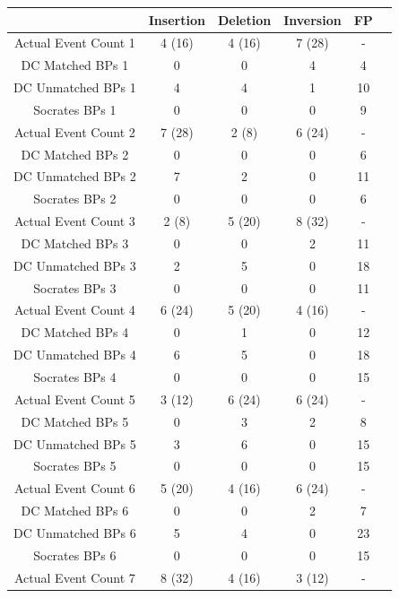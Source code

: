 \documentclass{easychithesis}
\begin{document}
\begin{table}[h]
\begin{center}
\begin{tabular}{|c|c|c|c|c|c|}\hline
         & Insertion & Deletion & Inversion & FP \\
        \hline 
        Actual Event Count 1 & 4 (16) & 4 (16) & 7 (28) & -\\
        DC Matched BPs 1 & 0 & 0 & 4 & 4\\
        DC Unmatched BPs 1 & 4 & 4 & 1 & 10\\
        Socrates BPs 1 & 0 & 0 & 0 & 9\\
        \hline 
        Actual Event Count 2 & 7 (28) & 2 (8) & 6 (24) & -\\
        DC Matched BPs 2 & 0 & 0 & 0 & 6\\
        DC Unmatched BPs 2 & 7 & 2 & 0 & 11\\
        Socrates BPs 2 & 0 & 0 & 0 & 6\\
        \hline 
        Actual Event Count 3 & 2 (8) & 5 (20) & 8 (32) & -\\
        DC Matched BPs 3 & 0 & 0 & 2 & 11\\
        DC Unmatched BPs 3 & 2 & 5 & 0 & 18\\
        Socrates BPs 3 & 0 & 0 & 0 & 11\\
        \hline 
        Actual Event Count 4 & 6 (24) & 5 (20) & 4 (16) & -\\
        DC Matched BPs 4 & 0 & 1 & 0 & 12\\
        DC Unmatched BPs 4 & 6 & 5 & 0 & 18\\
        Socrates BPs 4 & 0 & 0 & 0 & 15\\
        \hline 
        Actual Event Count 5 & 3 (12) & 6 (24) & 6 (24) & -\\
        DC Matched BPs 5 & 0 & 3 & 2 & 8\\
        DC Unmatched BPs 5 & 3 & 6 & 0 & 15\\
        Socrates BPs 5 & 0 & 0 & 0 & 15\\
         \hline 
        Actual Event Count 6 & 5 (20) & 4 (16) & 6 (24) & -\\
        DC Matched BPs 6 & 0 & 0 & 2 & 7\\
        DC Unmatched BPs 6 & 5 & 4 & 0 & 23\\
        Socrates BPs 6 & 0 & 0 & 0 & 15\\
         \hline 
        Actual Event Count 7 & 8 (32) & 4 (16) & 3 (12) & -\\

\end{tabular}
\end{center}
\end{table}
\end{document}
